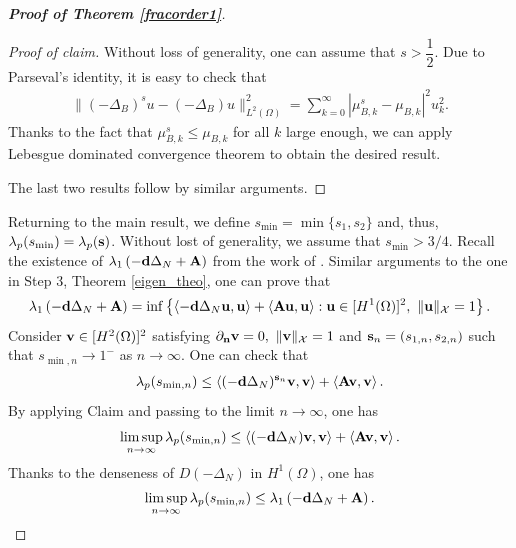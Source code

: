 \documentclass[a4paper,11pt]{amsart}
\theoremstyle{definition}
\def\O{\Omega}
\numberwithin{equation}{section}
\theoremstyle{definition}
\def\O{\Omega}
\begin{document}
\begin{proof}[\bf Proof of Theorem \ref{fracorder1}]
\begin{proof}[Proof of claim]
Without loss of generality, one can assume that $s>\dfrac{1}{2}$. Due to Parseval's identity, it is easy to check that
\begin{align*}
\|(-\Delta_B)^s u -(-\Delta_B) u\|_{L^2(\O)}^2 = \sum_{k=0}^\infty\left|\mu_{B,k}^s-\mu_{B,k}\right|^2u_k^2.
\end{align*}
Thanks to the fact that $\mu_{B,k}^s\leq \mu_{B,k}$ for all $k$ large enough, we can apply Lebesgue dominated convergence theorem to obtain the desired result.

The last two results follow by similar arguments.

\end{proof}


Returning to the main result, we define $s_{\min} = \min\{s_1, s_2\}$ and, thus, $\lambda_p(s_{\min})=\lambda_p({\bf s})$. Without lost of generality, we assume that $s_{\min}>3/4$. Recall the existence of $\lambda_1\left(-\textbf{d}\Delta_N+ {\bf A}\right)$ from the work of \cite[Lemma 3.2]{lam_ays_2016}. Similar arguments to the one in Step 3, Theorem \ref{eigen_theo}, one can prove that
\begin{align}\label{minlap}
\lambda_1\left(-\textbf{d}\Delta_N+ {\bf A}\right)=\inf\left\{\left<-\textbf{d}\Delta_N {\bf u},{\bf u}\right>+\left<{\bf Au},{\bf u}\right>:\textbf{u}\in [H^1(\O)]^2,~\|\textbf{u}\|_{\mathcal{X}}=1  \right\}.
\end{align}
Consider ${\bf v}\in [H^2(\O)]^2$ satisfying $\partial_{\bf n}{\bf v}=0,~\|{\bf v}\|_{\mathcal{X}}=1$ and ${\bf s}_n=(s_{1,n},s_{2,n})$ such that $s_{\min,n}\rightarrow 1^-$ as $n\rightarrow \infty$. One can check that
\begin{align*}
\lambda_p(s_{\min,n})\leq \left<(-\textbf{d}\Delta_N)^{\textbf{s}_n}{\bf v},{\bf v}\right> + \left<{\bf Av},{\bf v}\right>.
\end{align*}
By applying Claim and passing to the limit $n \to \infty$, one has
\begin{align*}
\limsup_{n\rightarrow \infty}\lambda_p(s_{\min,n}) \leq  \left<(-\textbf{d}\Delta_N){\bf v},{\bf v}\right> + \left<{\bf Av},{\bf v}\right>.
\end{align*}
Thanks to the denseness of $D(-\Delta_N)$ in $H^1(\O)$, one has
\begin{align*}
\limsup_{n\rightarrow \infty}\lambda_p(s_{\min,n}) \leq  \lambda_1\left(-\textbf{d}\Delta_N+ {\bf A}\right).
\end{align*}


\end{proof}
\end{document}
